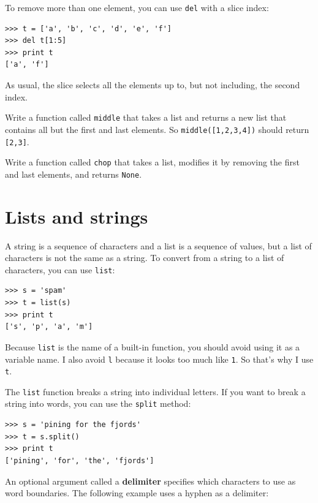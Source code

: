 \documentclass[10pt]{book}
\begin{document}
To remove more than one element, you can use {\tt del} with
a slice index:

\begin{verbatim}
>>> t = ['a', 'b', 'c', 'd', 'e', 'f']
>>> del t[1:5]
>>> print t
['a', 'f']
\end{verbatim}
%
As usual, the slice selects all the elements up to, but not
including, the second index.

\begin{exercise}

Write a function called \verb"middle" that takes a list and
returns a new list that contains all but the first and last
elements.  So \verb"middle([1,2,3,4])" should return \verb"[2,3]".

\end{exercise}

\begin{exercise}

Write a function called \verb"chop" that takes a list, modifies it
by removing the first and last elements, and returns {\tt None}.

\end{exercise}


\section{Lists and strings}

A string is a sequence of characters and a list is a sequence
of values, but a list of characters is not the same as a
string.  To convert from a string to a list of characters,
you can use {\tt list}:

\begin{verbatim}
>>> s = 'spam'
>>> t = list(s)
>>> print t
['s', 'p', 'a', 'm']
\end{verbatim}
%
Because {\tt list} is the name of a built-in function, you should
avoid using it as a variable name.  I also avoid {\tt l} because
it looks too much like {\tt 1}.  So that's why I use {\tt t}.

The {\tt list} function breaks a string into individual letters.  If
you want to break a string into words, you can use the {\tt split}
method:

\begin{verbatim}
>>> s = 'pining for the fjords'
>>> t = s.split()
>>> print t
['pining', 'for', 'the', 'fjords']
\end{verbatim}
%
An optional argument called a {\bf delimiter} specifies which
characters to use as word boundaries.
The following example
uses a hyphen as a delimiter:
\end{document}
